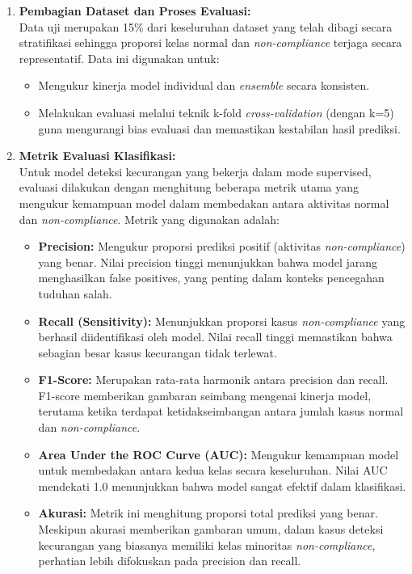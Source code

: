\begin{enumerate}
    \item \textbf{Pembagian Dataset dan Proses Evaluasi:} \\
    Data uji merupakan 15\% dari keseluruhan dataset yang telah dibagi secara stratifikasi sehingga proporsi kelas normal dan \textit{non-compliance} terjaga secara representatif. Data ini digunakan untuk:
    \begin{itemize}
        \item Mengukur kinerja model individual dan \textit{ensemble} secara konsisten.
        \item Melakukan evaluasi melalui teknik k-fold \textit{cross-validation} (dengan k=5) guna mengurangi bias evaluasi dan memastikan kestabilan hasil prediksi.
    \end{itemize}

    \item \textbf{Metrik Evaluasi Klasifikasi:} \\
    Untuk model deteksi kecurangan yang bekerja dalam mode supervised, evaluasi dilakukan dengan menghitung beberapa metrik utama yang mengukur kemampuan model dalam membedakan antara aktivitas normal dan \textit{non-compliance}. Metrik yang digunakan adalah:
    \begin{itemize}
        \item \textbf{Precision:} Mengukur proporsi prediksi positif (aktivitas \textit{non-compliance}) yang benar. Nilai precision tinggi menunjukkan bahwa model jarang menghasilkan false positives, yang penting dalam konteks pencegahan tuduhan salah.
        \item \textbf{Recall (Sensitivity):} Menunjukkan proporsi kasus \textit{non-compliance} yang berhasil diidentifikasi oleh model. Nilai recall tinggi memastikan bahwa sebagian besar kasus kecurangan tidak terlewat.
        \item \textbf{F1-Score:} Merupakan rata-rata harmonik antara precision dan recall. F1-score memberikan gambaran seimbang mengenai kinerja model, terutama ketika terdapat ketidakseimbangan antara jumlah kasus normal dan \textit{non-compliance}.
        \item \textbf{Area Under the ROC Curve (AUC):} Mengukur kemampuan model untuk membedakan antara kedua kelas secara keseluruhan. Nilai AUC mendekati 1.0 menunjukkan bahwa model sangat efektif dalam klasifikasi.
        \item \textbf{Akurasi:} Metrik ini menghitung proporsi total prediksi yang benar. Meskipun akurasi memberikan gambaran umum, dalam kasus deteksi kecurangan yang biasanya memiliki kelas minoritas \textit{non-compliance}, perhatian lebih difokuskan pada precision dan recall.
    \end{itemize}


\end{enumerate}
